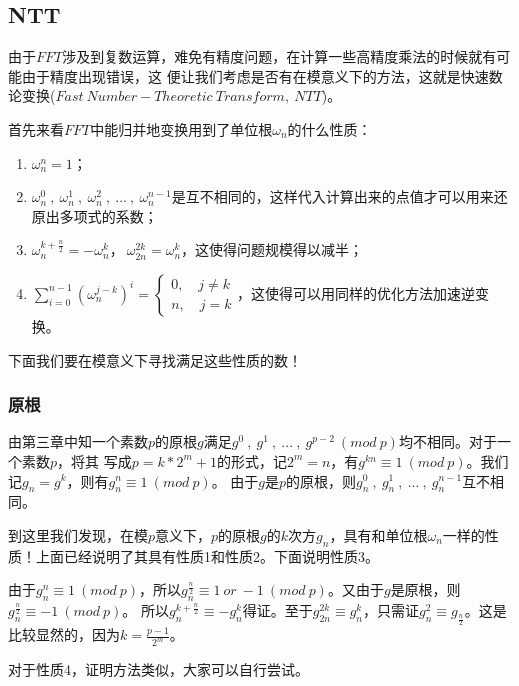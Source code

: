 

\subsection{NTT}
由于$FFT$涉及到复数运算，难免有精度问题，在计算一些高精度乘法的时候就有可能由于精度出现错误，这
便让我们考虑是否有在模意义下的方法，这就是{\heiti 快速数论变换}($Fast\ Number-Theoretic\ Transform,\ NTT$)。

首先来看$FFT$中能归并地变换用到了单位根$\omega_n$的什么性质：
\begin{enumerate}
\item $\omega_n^n = 1$；
\item $\omega_n^0\ ,\ \omega_n^1\ ,\ \omega_n^2\ ,\ ...\ ,\ \omega_n^{n-1}$是互不相同的，这样代入计算出来的点值才可以用来还原出多项式的系数；
\item $\omega_n^{k+\frac{n}{2}}=-\omega_n^{k}$，$\ \omega_{2n}^{2k}=\omega_n^k$，这使得问题规模得以减半；
\item $\sum_{i=0}^{n-1}(\omega_n^{j-k})^i = \left\{\begin{matrix}
0,\quad j\neq k\\ 
n,\quad j= k
\end{matrix}\right.$，这使得可以用同样的优化方法加速逆变换。
\end{enumerate}

下面我们要在模意义下寻找满足这些性质的数！

\subsubsection{原根}
由第三章中知一个素数$p$的原根$g$满足$g^0\ ,\ g^1\ ,\ ...\ ,\ g^{p-2}\ (mod\ p)$均不相同。对于一个素数$p$，将其
写成$p=k*2^m + 1$的形式，记$2^m=n$，有$g^{kn}\equiv 1\ (mod\ p)$。我们记$g_n = g^k$，则有$g_n^n\equiv 1\ (mod\ p)$。
由于$g$是$p$的原根，则$g_n^0\ ,\ g_n^1\ ,\ ...\ ,\ g_n^{n-1}$互不相同。

到这里我们发现，在模$p$意义下，$p$的原根$g$的$k$次方$g_n$，具有和单位根$\omega_n$一样的性质！上面已经说明了其具有性质1和性质2。下面说明性质3。

由于$g_n^n\equiv 1\ (mod\ p)$，所以$g_n^{\frac{n}{2}}\equiv 1\ or\ -1\ (mod\ p)$。又由于$g$是原根，则$g_n^{\frac{n}{2}}\equiv -1\ (mod\ p)$。
所以$g_n^{k+\frac{n}{2}}\equiv -g_n^{k}$得证。至于$g_{2n}^{2k}\equiv g_n^k$，只需证$g_n^2\equiv g_{\frac{n}{2}}$。这是比较显然的，因为$k=\frac{p-1}{2^m}$。

对于性质4，证明方法类似，大家可以自行尝试。

